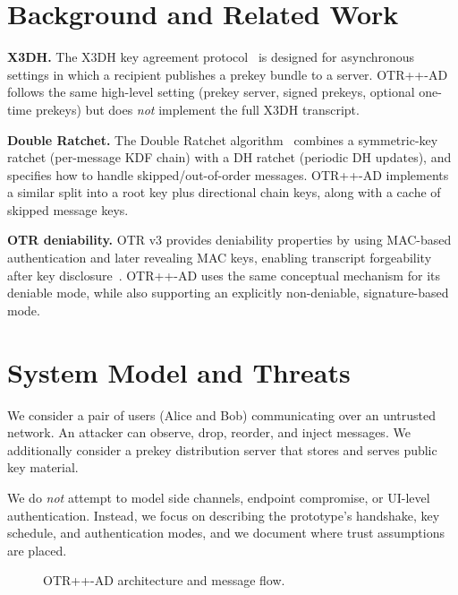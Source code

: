 \documentclass[11pt]{article}
\newcommand{\prot}{OTR++-AD}
\begin{document}
\section{Background and Related Work}
\textbf{X3DH.} The X3DH key agreement protocol~\cite{signal_x3dh} is designed for asynchronous settings in which a recipient publishes a prekey bundle to a server.
\prot{} follows the same high-level setting (prekey server, signed prekeys, optional one-time prekeys) but does \emph{not} implement the full X3DH transcript.

\textbf{Double Ratchet.} The Double Ratchet algorithm~\cite{signal_doubleratchet} combines a symmetric-key ratchet (per-message KDF chain) with a DH ratchet (periodic DH updates), and specifies how to handle skipped/out-of-order messages.
\prot{} implements a similar split into a root key plus directional chain keys, along with a cache of skipped message keys.

\textbf{OTR deniability.} OTR v3 provides deniability properties by using MAC-based authentication and later revealing MAC keys, enabling transcript forgeability after key disclosure~\cite{otr_v3}.
\prot{} uses the same conceptual mechanism for its deniable mode, while also supporting an explicitly non-deniable, signature-based mode.

\section{System Model and Threats}
We consider a pair of users (Alice and Bob) communicating over an untrusted network.
An attacker can observe, drop, reorder, and inject messages.
We additionally consider a prekey distribution server that stores and serves public key material.

We do \emph{not} attempt to model side channels, endpoint compromise, or UI-level authentication.
Instead, we focus on describing the prototype's handshake, key schedule, and authentication modes, and we document where trust assumptions are placed.

\begin{figure}[t]
\centering
{}
\caption{\prot{} architecture and message flow.}
\label{fig:architecture}
\end{figure}
\end{document}
